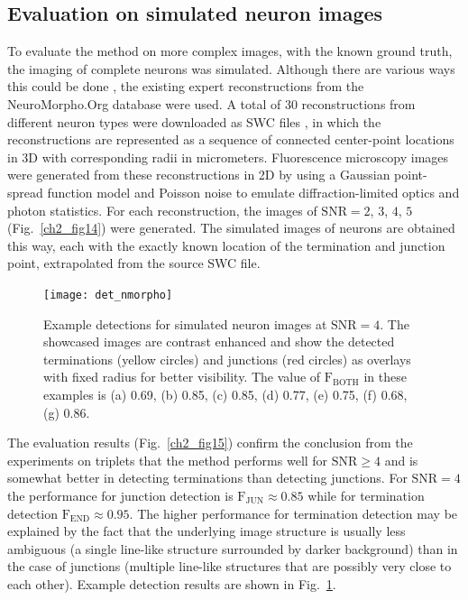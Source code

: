 \subsection{Evaluation on simulated neuron images}
\label{ch2:subsec:experiments-simulated}
To evaluate the method on more complex images, with the known ground truth, the imaging of complete neurons was simulated. Although there are various ways this could be done \cite{koene2009netmorph, vasilkoski2009detection}, the existing expert reconstructions from the NeuroMorpho.Org database \cite{ascoli2007neuromorpho} were used. A total of 30 reconstructions from different neuron types were downloaded as SWC files \cite{cannon1998line}, in which the reconstructions are represented as a sequence of connected center-point locations in 3D with corresponding radii in micrometers. Fluorescence microscopy images were generated from these reconstructions in 2D by using a Gaussian point-spread function model and Poisson noise to emulate diffraction-limited optics and photon statistics. For each reconstruction, the images of $\textrm{SNR}=2$, $3$, $4$, $5$ (Fig.~\ref{ch2_fig14}) were generated. The simulated images of neurons are obtained this way, each with the exactly known location of the termination and junction point, extrapolated from the source SWC file.
\begin{figure}
	\centering
		\texttt{[image: det\_nmorpho]}
			\caption{Example detections for simulated neuron images at $\textrm{SNR}=4$. The showcased images are contrast enhanced and show the detected terminations (yellow circles) and junctions (red circles) as overlays with fixed radius for better visibility. The value of $\textrm{F}_\textrm{BOTH}$ in these examples is (a) 0.69, (b) 0.85, (c) 0.85, (d) 0.77, (e) 0.75, (f) 0.68, (g) 0.86.}
	\label{ch2_fig16}
\end{figure}
The evaluation results (Fig.~\ref{ch2_fig15}) confirm the conclusion from the experiments on triplets that the method performs well for $\textrm{SNR} \geq 4$ and is somewhat better in detecting terminations than detecting junctions. For $\textrm{SNR} = 4$ the performance for junction detection is $\textrm{F}_{\textrm{JUN}} \approx 0.85$ while for termination detection $\textrm{F}_{\textrm{END}} \approx 0.95$. The higher performance for termination detection may be explained by the fact that the underlying image structure is usually less ambiguous (a single line-like structure surrounded by darker background) than in the case of junctions (multiple line-like structures that are possibly very close to each other). Example detection results are shown in Fig.~\ref{ch2_fig16}.
